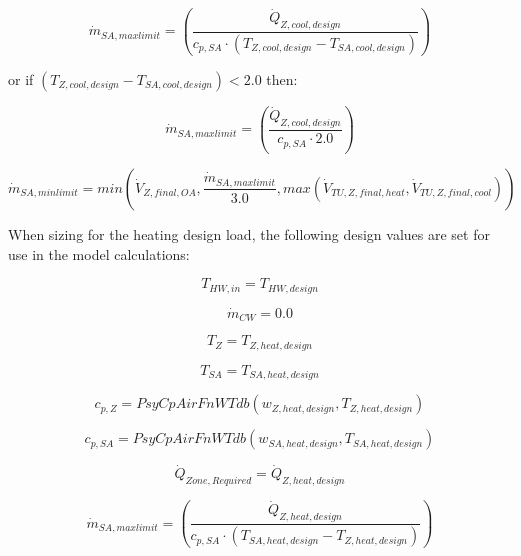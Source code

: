 \begin{equation}
  {\dot m_{SA,max limit}} = { \left(\frac{{\dot Q_{Z,cool,design } }}{{c_{p,SA}} \cdot {( {T_{Z,cool,design } } - {T_{SA,cool,design } } )}}  \right) }
\end{equation}  
  
or if \(({T_{Z,cool,design }} - {T_{SA,cool,design}}) < 2.0\) then:

\begin{equation}
  {\dot m_{SA,max limit}} = { \left(\frac{{\dot Q_{Z,cool,design } }}{{c_{p,SA}} \cdot 2.0 } \right) }
\end{equation}

\begin{equation}
  {\dot m_{SA,min limit}} = min( {\dot V_{Z,final,OA} }, \frac{{\dot m_{SA,max limit}}}{3.0}, max({\dot V_{TU,Z,final,heat} } , {\dot V_{TU,Z,final,cool} }) )
\end{equation}

When sizing for the heating design load, the following design values are set for use in the model calculations:

\begin{equation}
  {T_{HW,in}} = {T_{HW,design}}
\end{equation}

\begin{equation}
  {\dot m_{CW}} = {0.0}
\end{equation}

\begin{equation}
  {T_{Z}} = {T_{Z,heat,design } }
\end{equation}

\begin{equation}
  {T_{SA}} = {T_{SA,heat,design}}
\end{equation}

\begin{equation}
  {c_{p,Z}} = {PsyCpAirFnWTdb ({w_{Z,heat,design } },  {T_{Z,heat,design } }  ) }
\end{equation}

\begin{equation}
  {c_{p,SA}} = {PsyCpAirFnWTdb ( {w_{SA,heat,design } },  {T_{SA,heat,design } }   ) }
\end{equation}

\begin{equation}
  {\dot Q_{Zone, Required}} = {\dot Q_{Z,heat,design } }
\end{equation}

\begin{equation}
  {\dot m_{SA,max limit}} = { \left(\frac{{\dot Q_{Z,heat,design } }}{{c_{p,SA}} \cdot ( {T_{SA,heat,design } } - {T_{Z,heat,design }} ) } \right) }
\end{equation}


